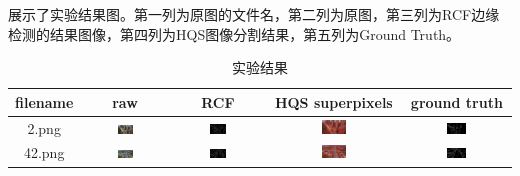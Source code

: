 展示了实验结果图。第一列为原图的文件名，第二列为原图，第三列为RCF边缘检测的结果图像，第四列为HQS图像分割结果，第五列为Ground Truth。

\begin{table}[htbp]
    \centering
    \caption{实验结果}
    \begin{tabular}{ccccc}
      \toprule
      filename & raw & RCF & HQS superpixels & ground truth \\
      \midrule
      2.png & \includegraphics[width=0.2\textwidth]{pic/raw/2.png} & \includegraphics[width=0.2\textwidth]{pic/rcf/2.png} & \includegraphics[width=0.2\textwidth]{pic/hqs/500/2.png} & \includegraphics[width=0.2\textwidth]{pic/gt/2.png} \\
      42.png & \includegraphics[width=0.2\textwidth]{pic/raw/42.png} & \includegraphics[width=0.2\textwidth]{pic/rcf/42.png} & \includegraphics[width=0.2\textwidth]{pic/hqs/500/42.png} & \includegraphics[width=0.2\textwidth]{pic/gt/42.png} \\

\end{tabular}
\end{table}
